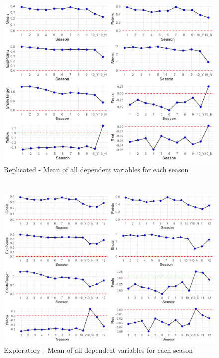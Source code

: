 \begin{appendices}
\newpage

\section{}
\label{appendix:replic}
\begin{figure}[H]
    \centering
    \caption{Replicated - Mean of all dependent variables for each season}
    \includegraphics[width=1\textwidth]{Figures/Replicated_plot.png}
\end{figure}
\newpage
\section{}
\label{appendix:explor}
\begin{figure}[H]
    \centering
    \caption{Exploratory - Mean of all dependent variables for each season}
    \includegraphics[width=1\textwidth]{Figures/Exploratory_plot.png}
\end{figure}

\end{appendices}